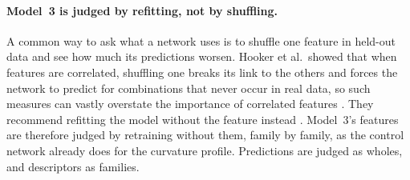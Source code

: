 \paragraph{Model~3 is judged by refitting, not by shuffling.}
A common way to ask what a network uses is to shuffle one feature in held-out data and see how much its predictions worsen.
Hooker et al.\ showed that when features are correlated, shuffling one breaks its link to the others and forces the network to predict for combinations that never occur in real data, so such measures can vastly overstate the importance of correlated features \cite{hooker2021permutation}.
They recommend refitting the model without the feature instead \cite{hooker2021permutation}.
Model~3's features are therefore judged by retraining without them, family by family, as the control network already does for the curvature profile.
Predictions are judged as wholes, and descriptors as families.

